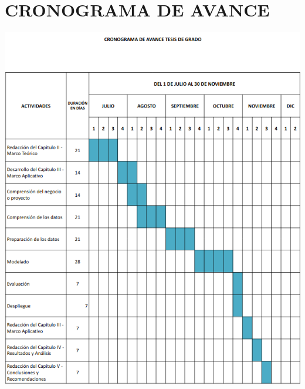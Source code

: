 \chapter{CRONOGRAMA DE AVANCE}

\begin{center}
    \includegraphics[scale=0.7]{imagenes/cronograma-crisp}
\end{center}
